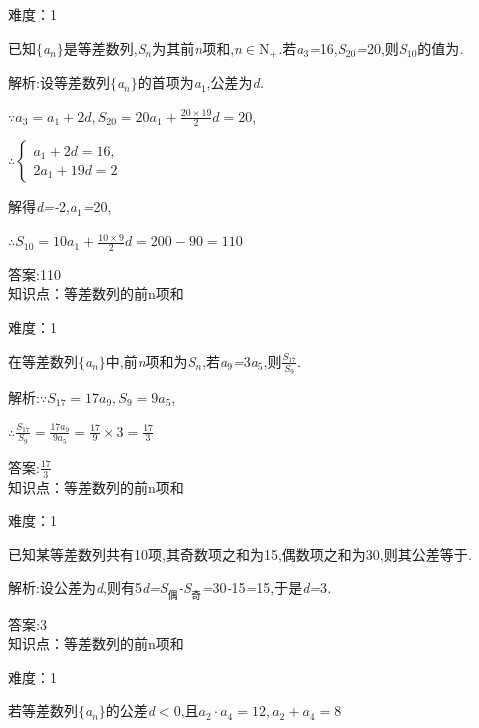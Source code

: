 \documentclass{article} %
\begin{document}
难度：1

 已知$\mathrm{\{}$\textit{a${}_{n}$}$\mathrm{\}}$是等差数列,\textit{S${}_{n}$}为其前\textit{n}项和,\textit{n}$\mathrm{\in}$N\textit{${}_{+}$.}若\textit{a}${}_{3}$\textit{=}16,\textit{S}${}_{20}$\textit{=}20,则\textit{S}${}_{10}$的值为\textit{\underbar{　　　　　}.~}

 解析:设等差数列$\mathrm{\{}$\textit{a${}_{n}$}$\mathrm{\}}$的首项为\textit{a}${}_{1}$,公差为\textit{d.}

$\because a_3=a_1+2d,S_{20}=20a_1+\frac{20\times 19}{2}d=20$,

$\therefore \left\{
\begin{array}{l}
a_1+2d=16, \\
2a_1+19d=2
\end{array}
\right.$

解得\textit{d=-}2,\textit{a}${}_{1}$\textit{=}20,

$\therefore S_{10}=10a_1+\frac{10\times 9}{2}d=200-90=110$

 答案:110 \\

知识点：等差数列的前n项和

难度：1

 在等差数列$\mathrm{\{}$\textit{a${}_{n}$}$\mathrm{\}}$中,前\textit{n}项和为\textit{S${}_{n}$},若\textit{a}${}_{9}$\textit{=}3\textit{a}${}_{5}$,则$\frac{S_{17}}{S_9}$\underbar{　　　　　}.

 解析:$\because S_{17}=17a_9,S_9=9a_5$,

$\therefore \frac{S_{17}}{S_9}=\frac{17a_9}{9a_5}=\frac{17}{9}\times 3=\frac{17}{3}$

 答案:$\frac{17}{3}$ \\

知识点：等差数列的前n项和

难度：1

 已知某等差数列共有10项,其奇数项之和为15,偶数项之和为30,则其公差等于\textit{\underbar{　　　　　}.~}

 解析:设公差为\textit{d},则有5\textit{d=S}${}_{\textrm{偶}}$\textit{-S}${}_{\textrm{奇}}$\textit{=}30\textit{-}15\textit{=}15,于是\textit{d=}3\textit{.}

 答案:3 \\

知识点：等差数列的前n项和

难度：1

 若等差数列$\mathrm{\{}$\textit{a${}_{n}$}$\mathrm{\}}$的公差\textit{d$<$}0,且$a_2\cdot a_4=12,a_2+a_4=8$
\end{document}
